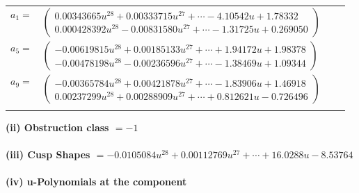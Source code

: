 \documentclass[1p]{elsarticle_modified}
\theoremstyle{definition}
\begin{document}
\begin{tabular}{m{7pt} m{180pt} m{7pt} m{180pt} }
\flushright $a_{1}=$&$\begin{pmatrix}0.00343665 u^{28}+0.00333715 u^{27}+\cdots-4.10542 u+1.78332\\0.000428392 u^{28}-0.00831580 u^{27}+\cdots-1.31725 u+0.269050\end{pmatrix}$ \\
\flushright $a_{5}=$&$\begin{pmatrix}-0.00619815 u^{28}+0.00185133 u^{27}+\cdots+1.94172 u+1.98378\\-0.00478198 u^{28}-0.00236596 u^{27}+\cdots-1.38469 u+1.09344\end{pmatrix}$ \\
\flushright $a_{9}=$&$\begin{pmatrix}-0.00365784 u^{28}+0.00421878 u^{27}+\cdots-1.83906 u+1.46918\\0.00237299 u^{28}+0.00288909 u^{27}+\cdots+0.812621 u-0.726496\end{pmatrix}$\\&\end{tabular}
\flushleft \textbf{(ii) Obstruction class $= -1$}\\~\\
\flushleft \textbf{(iii) Cusp Shapes $= -0.0105084 u^{28}+0.00112769 u^{27}+\cdots+16.0288 u-8.53764$}\\~\\
\newpage\renewcommand{\arraystretch}{1}
\flushleft \textbf{(iv) u-Polynomials at the component}\newline \\
\end{document}
